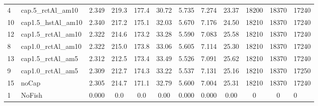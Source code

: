 \documentclass[11pt]{book}
\begin{document}
\begin{landscape}
\begin{longtable}[t]{llcccccccccl}
4 & cap.5\_rctAl\_am10 & 2.349 & 219.3 & 177.4 & 30.72 & 5.735 & 7.274 & 23.37 & 18200 & 18370 & 17240\\
10 & cap1.5\_hstAl\_am10 & 2.340 & 217.2 & 175.1 & 32.03 & 5.670 & 7.176 & 24.50 & 18210 & 18370 & 17240\\
12 & cap1.5\_rctAl\_am10 & 2.322 & 214.6 & 173.2 & 33.28 & 5.590 & 7.083 & 25.58 & 18210 & 18370 & 17240\\
8 & cap1.0\_rctAl\_am10 & 2.322 & 215.0 & 173.8 & 33.06 & 5.605 & 7.114 & 25.30 & 18210 & 18370 & 17240\\
13 & cap1.5\_rctAl\_am5 & 2.312 & 212.5 & 173.4 & 33.49 & 5.526 & 7.091 & 25.62 & 18210 & 18370 & 17240\\
9 & cap1.0\_rctAl\_am5 & 2.309 & 212.7 & 174.3 & 33.22 & 5.537 & 7.131 & 25.16 & 18210 & 18370 & 17250\\
15 & noCap & 2.305 & 214.7 & 171.1 & 32.79 & 5.600 & 7.004 & 25.31 & 18210 & 18370 & 17240\\
1 & NoFish & 0.000 & 0.0 & 0.0 & 0.00 & 0.000 & 0.000 & 0.00 & 0 & 0 & 0\\*
\end{longtable}
\end{landscape}
\endgroup{}

\newpage
\end{document}
